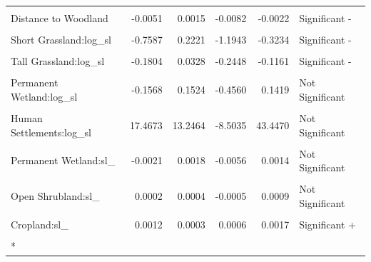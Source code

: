\documentclass[10pt,a4paper]{article}
\begin{document}
\begin{longtable}[t]{lrrrrl}
\addlinespace
\cellcolor{gray!10}{Open Shrubland} & \cellcolor{gray!10}{1.4684} & \cellcolor{gray!10}{0.3958} & \cellcolor{gray!10}{0.6163} & \cellcolor{gray!10}{2.2074} & \cellcolor{gray!10}{Significant +}\\
Distance to Woodland & -0.0051 & 0.0015 & -0.0082 & -0.0022 & Significant -\\
\cellcolor{gray!10}{Distance to Hedges} & \cellcolor{gray!10}{-0.0009} & \cellcolor{gray!10}{0.0005} & \cellcolor{gray!10}{-0.0019} & \cellcolor{gray!10}{0.0001} & \cellcolor{gray!10}{Not Significant}\\
Short Grassland:log\_sl & -0.7587 & 0.2221 & -1.1943 & -0.3234 & Significant -\\
\cellcolor{gray!10}{Open Shrubland:log\_sl} & \cellcolor{gray!10}{-0.2584} & \cellcolor{gray!10}{0.0477} & \cellcolor{gray!10}{-0.3528} & \cellcolor{gray!10}{-0.1659} & \cellcolor{gray!10}{Significant -}\\
\addlinespace
Tall Grassland:log\_sl & -0.1804 & 0.0328 & -0.2448 & -0.1161 & Significant -\\
\cellcolor{gray!10}{Cropland:log\_sl} & \cellcolor{gray!10}{-0.1591} & \cellcolor{gray!10}{0.0412} & \cellcolor{gray!10}{-0.2398} & \cellcolor{gray!10}{-0.0784} & \cellcolor{gray!10}{Significant -}\\
Permanent Wetland:log\_sl & -0.1568 & 0.1524 & -0.4560 & 0.1419 & Not Significant\\
\cellcolor{gray!10}{Evergreen Needleleaf Forest:log\_sl} & \cellcolor{gray!10}{0.0388} & \cellcolor{gray!10}{0.0442} & \cellcolor{gray!10}{-0.0482} & \cellcolor{gray!10}{0.1252} & \cellcolor{gray!10}{Not Significant}\\
Human Settlements:log\_sl & 17.4673 & 13.2464 & -8.5035 & 43.4470 & Not Significant\\
\addlinespace
\cellcolor{gray!10}{Human Settlements:sl\_} & \cellcolor{gray!10}{-0.1214} & \cellcolor{gray!10}{0.0825} & \cellcolor{gray!10}{-0.2835} & \cellcolor{gray!10}{0.0399} & \cellcolor{gray!10}{Not Significant}\\
Permanent Wetland:sl\_ & -0.0021 & 0.0018 & -0.0056 & 0.0014 & Not Significant\\
\cellcolor{gray!10}{Evergreen Needleleaf Forest:sl\_} & \cellcolor{gray!10}{-0.0003} & \cellcolor{gray!10}{0.0003} & \cellcolor{gray!10}{-0.0009} & \cellcolor{gray!10}{0.0004} & \cellcolor{gray!10}{Not Significant}\\
Open Shrubland:sl\_ & 0.0002 & 0.0004 & -0.0005 & 0.0009 & Not Significant\\
\cellcolor{gray!10}{Tall Grassland:sl\_} & \cellcolor{gray!10}{0.0005} & \cellcolor{gray!10}{0.0002} & \cellcolor{gray!10}{0.0001} & \cellcolor{gray!10}{0.0009} & \cellcolor{gray!10}{Significant +}\\
\addlinespace
Cropland:sl\_ & 0.0012 & 0.0003 & 0.0006 & 0.0017 & Significant +\\
\cellcolor{gray!10}{Short Grassland:sl\_} & \cellcolor{gray!10}{0.0044} & \cellcolor{gray!10}{0.0013} & \cellcolor{gray!10}{0.0018} & \cellcolor{gray!10}{0.0070} & \cellcolor{gray!10}{Significant +}\\*
\end{longtable}
\endgroup{}
\end{document}
